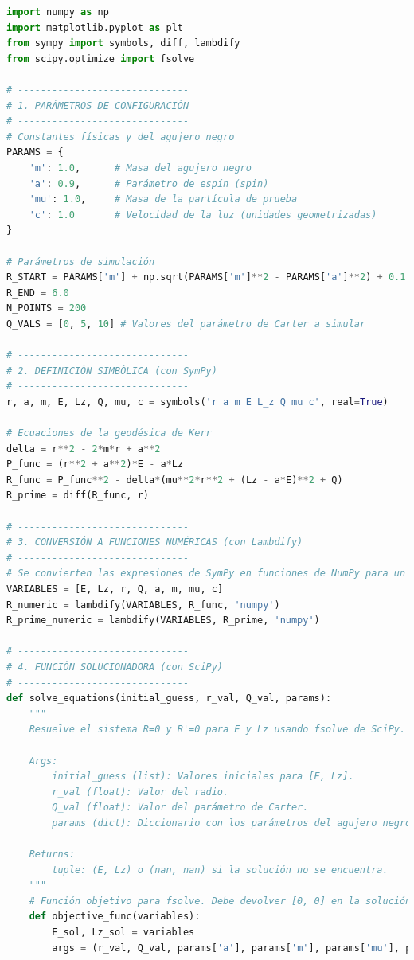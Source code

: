 \begin{lstlisting}[language=Python, caption={Cálculo numérico de las constantes para órbitas circulares en Kerr}, label={lst:kerr_circular_orbits}]
import numpy as np
import matplotlib.pyplot as plt
from sympy import symbols, diff, lambdify
from scipy.optimize import fsolve

# ------------------------------
# 1. PARÁMETROS DE CONFIGURACIÓN
# ------------------------------
# Constantes físicas y del agujero negro
PARAMS = {
    'm': 1.0,      # Masa del agujero negro
    'a': 0.9,      # Parámetro de espín (spin)
    'mu': 1.0,     # Masa de la partícula de prueba
    'c': 1.0       # Velocidad de la luz (unidades geometrizadas)
}

# Parámetros de simulación
R_START = PARAMS['m'] + np.sqrt(PARAMS['m']**2 - PARAMS['a']**2) + 0.1  # Justo fuera del horizonte
R_END = 6.0
N_POINTS = 200
Q_VALS = [0, 5, 10] # Valores del parámetro de Carter a simular

# ------------------------------
# 2. DEFINICIÓN SIMBÓLICA (con SymPy)
# ------------------------------
r, a, m, E, Lz, Q, mu, c = symbols('r a m E L_z Q mu c', real=True)

# Ecuaciones de la geodésica de Kerr
delta = r**2 - 2*m*r + a**2
P_func = (r**2 + a**2)*E - a*Lz
R_func = P_func**2 - delta*(mu**2*r**2 + (Lz - a*E)**2 + Q)
R_prime = diff(R_func, r)

# ------------------------------
# 3. CONVERSIÓN A FUNCIONES NUMÉRICAS (con Lambdify)
# ------------------------------
# Se convierten las expresiones de SymPy en funciones de NumPy para un cálculo rápido.
VARIABLES = [E, Lz, r, Q, a, m, mu, c]
R_numeric = lambdify(VARIABLES, R_func, 'numpy')
R_prime_numeric = lambdify(VARIABLES, R_prime, 'numpy')

# ------------------------------
# 4. FUNCIÓN SOLUCIONADORA (con SciPy)
# ------------------------------
def solve_equations(initial_guess, r_val, Q_val, params):
    """
    Resuelve el sistema R=0 y R'=0 para E y Lz usando fsolve de SciPy.
    
    Args:
        initial_guess (list): Valores iniciales para [E, Lz].
        r_val (float): Valor del radio.
        Q_val (float): Valor del parámetro de Carter.
        params (dict): Diccionario con los parámetros del agujero negro.
        
    Returns:
        tuple: (E, Lz) o (nan, nan) si la solución no se encuentra.
    """
    # Función objetivo para fsolve. Debe devolver [0, 0] en la solución.
    def objective_func(variables):
        E_sol, Lz_sol = variables
        args = (r_val, Q_val, params['a'], params['m'], params['mu'], params['c'])
        

\end{lstlisting}
